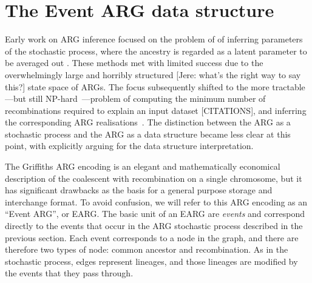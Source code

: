 \documentclass{article}
\begin{document}
\section*{The Event ARG data structure}
Early work on ARG inference focused on the problem of
of inferring parameters of the
stochastic process, where the ancestry is regarded as a
latent parameter to be averaged out
\citep[e.g.][]{griffiths1996ancestral,kuhner2000maximum, nielsen2000estimation,
fearnhead2001estimating}. These methods met with limited success
due to the overwhelmingly large and
horribly structured [Jere: what's the right way to say this?]
state space of ARGs. The focus subsequently shifted to
the more tractable---but still
NP-hard~\citep{wang2001perfect}---problem of computing
the minimum number of recombinations required
to explain an input dataset [CITATIONS], and inferring the corresponding
ARG realisations~\citep{song2003parsimonious,song2005efficient,lyngso2005minimum}.
The distinction between the ARG as a stochastic process
and the ARG as a data structure became less clear at this point,
with \citet{minichiello2006mapping} explicitly arguing for
the data structure interpretation.

The Griffiths ARG encoding is an elegant and mathematically
economical description of the coalescent with recombination on a single
chromosome, but it has significant drawbacks as the basis for a general purpose
storage and interchange format. To avoid confusion, we will refer to this
ARG encoding as an ``Event ARG'', or EARG.
The basic unit of an EARG are \emph{events} and correspond directly
to the events that
occur in the ARG stochastic process described in the previous section.
Each event corresponds to a node in the graph, and there are therefore
two types of node: common ancestor and recombination. As in the
stochastic process, edges represent lineages, and those lineages
are modified by the events that they pass through.
\end{document}
